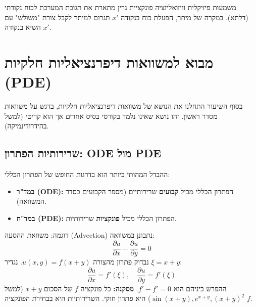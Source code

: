 \begin{examplebox}{משמעות פיזיקלית וויזואליזציה}
    פונקציית גרין מתארת את תגובת המערכת לכוח נקודתי (דלתא). במקרה של מיתר, הפעלת כוח בנקודה $x'$ תגרום למיתר לקבל צורת "משולש" עם השיא בנקודה $x'$.
    
    \begin{center}
    \end{center}
\end{examplebox}

\section{מבוא למשוואות דיפרנציאליות חלקיות (PDE)}

בסוף השיעור התחלנו את הנושא של משוואות דיפרנציאליות חלקיות, בדגש על משוואות מסדר ראשון. זהו נושא שאינו נלמד בקורסי בסיס אחרים אך הוא קריטי (למשל בהידרודינמיקה).

\subsection{שרירותיות הפתרון: ODE מול PDE}
ההבדל המהותי ביותר הוא בדרגות החופש של הפתרון הכללי:
\begin{itemize}
    \item \textbf{במד"ר (ODE):} הפתרון הכללי מכיל \textbf{קבועים} שרירותיים (מספר הקבועים כסדר המשוואה).
    \item \textbf{במד"ח (PDE):} הפתרון הכללי מכיל \textbf{פונקציות} שרירותיות.
\end{itemize}

\begin{examplebox}{דוגמה: משוואת ההסעה (Advection)}
    נתבונן במשוואה:
    \begin{equation}
        \frac{\partial u}{\partial x} - \frac{\partial u}{\partial y} = 0
    \end{equation}
    נבדוק פתרון מהצורה $u(x,y) = f(x+y)$. נגדיר $\xi = x+y$:
    $$ \frac{\partial u}{\partial x} = f'(\xi), \quad \frac{\partial u}{\partial y} = f'(\xi) $$
    ההפרש ביניהם הוא $f' - f' = 0$.
    \textbf{מסקנה:} כל פונקציה $f$ של הסכום $x+y$ (למשל $\sin(x+y), e^{x+y}, (x+y)^2$) היא פתרון חוקי. השרירותיות היא בבחירת הפונקציה $f$.
\end{examplebox}